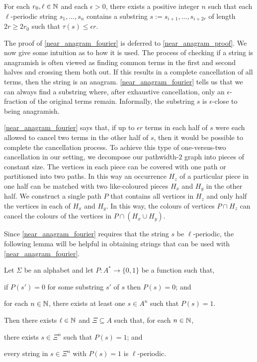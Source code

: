 \documentclass{patmorin}
\begin{document}
\begin{lem}\label{near_anagram_fourier}
    For each $r_0,\ell\in\mathbb{N}$ and each $\epsilon>0$, there exists a positive integer $n$ such that each $\ell$-periodic string $s_1,\ldots,s_n$ contains a substring $s:=s_{i+1},\ldots,s_{i+2r}$ of length $2r \ge 2r_0$ such that $\tau(s)\le \epsilon r$.
\end{lem}

The proof of \cref{near_anagram_fourier} is deferred to \cref{near_anagram_proof}.  We now give some intuition as to how it is used.  The process of checking if a string is anagramish is often viewed as finding common terms in the first and second halves and crossing them both out.  If this results in a complete cancellation of all terms, then the string is an anagram.  \cref{near_anagram_fourier} tells us that we can always find a substring where, after exhaustive cancellation, only an $\epsilon$-fraction of the original terms remain.  Informally, the substring $s$ is $\epsilon$-close to being anagramish.

\cref{near_anagram_fourier} says that, if up to $\epsilon r$ terms in each half of $s$ were each allowed to cancel two terms in the other half of $s$, then it would be possible to complete the cancellation process.  To achieve this type of one-versus-two cancellation in our setting, we decompose our pathwidth-$2$ graph into pieces of constant size.  The vertices in each piece can be covered with one path or partitioned into two paths.  In this way an occurrence $H_z$ of a particular piece in one half can be matched with two like-coloured pieces $H_x$ and $H_y$ in the other half. We construct a single path $P$ that contains all vertices in $H_z$ and only half the vertices in each of $H_x$ and $H_y$.  In this way, the colours of vertices $P\cap H_z$ can cancel the colours of the vertices in $P\cap(H_x\cup H_y)$.

Since \cref{near_anagram_fourier} requires that the string $s$ be $\ell$-periodic, the following lemma will be helpful in obtaining strings that can be used with \cref{near_anagram_fourier}.

\begin{lem}\label{periodicity}
    Let $\Sigma$ be an alphabet and let $P:A^*\to\{0,1\}$ be a function such that,
    \begin{compactenum}[({A}1)]
        \item if $P(s')=0$ for some substring $s'$ of $s$ then $P(s)=0$; and
        \item for each $n\in\mathbb{N}$, there exists at least one $s\in A^n$ such that $P(s)=1$.
    \end{compactenum}
    Then there exists $\ell\in\mathbb{N}$ and $\Xi\subseteq A$ such that, for each $n\in\mathbb{N}$,
    \begin{compactenum}[(C1)]
        \item there exists $s\in\Xi^n$ such that $P(s)=1$; and
        \item every string in $s\in\Xi^n$ with $P(s)=1$ is $\ell$-periodic.
    \end{compactenum}
\end{lem}
\end{document}
